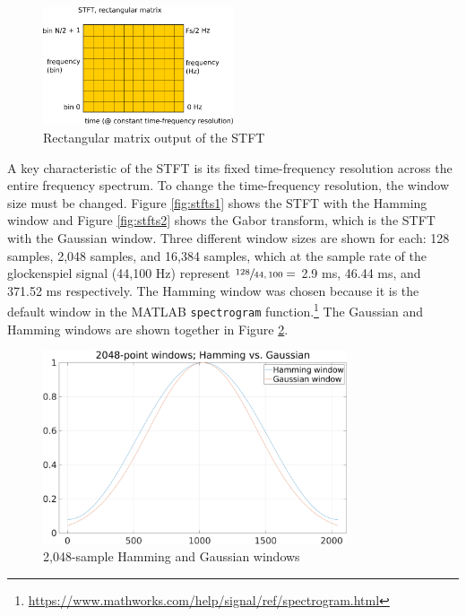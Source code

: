 \documentclass[report.tex]{subfiles}
\begin{document}
\begin{figure}[ht]
	\centering
	\includegraphics[width=0.5\textwidth]{./images-blockdiagrams/stft_diag.png}
	\caption{Rectangular matrix output of the STFT}
	\label{fig:stftdiag}
\end{figure}

A key characteristic of the STFT is its fixed time-frequency resolution across the entire frequency spectrum. To change the time-frequency resolution, the window size must be changed.  Figure \ref{fig:stfts1} shows the STFT with the Hamming window and Figure \ref{fig:stfts2} shows the Gabor transform, which is the STFT with the Gaussian window. Three different window sizes are shown for each: 128 samples, 2,048 samples, and 16,384 samples, which at the sample rate of the glockenspiel signal (44,100 Hz) represent $\sfrac{128}{44,100} =$ 2.9 ms, 46.44 ms, and 371.52 ms respectively. The Hamming window was chosen because it is the default window in the MATLAB \Verb#spectrogram# function.\footnote{\url{https://www.mathworks.com/help/signal/ref/spectrogram.html}} The Gaussian and Hamming windows are shown together in Figure \ref{fig:gaussvshamm}.

\begin{figure}[ht]
	\centering
	\includegraphics[width=0.8\textwidth]{./images-tftheory/hamming_vs_gauss.png}
	\caption{2,048-sample Hamming and Gaussian windows}
	\label{fig:gaussvshamm}
\end{figure}
\end{document}

